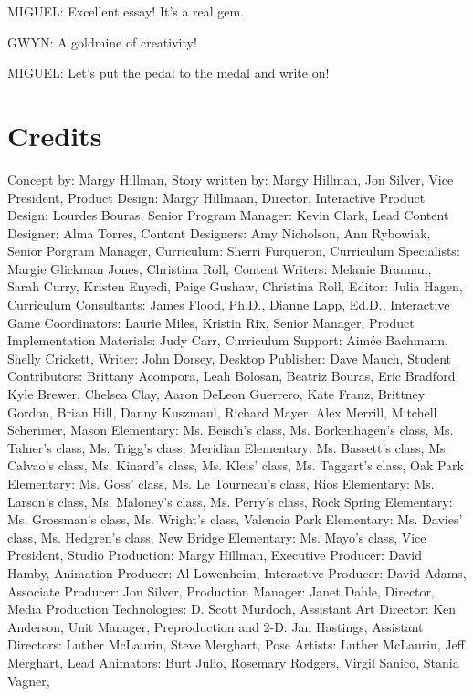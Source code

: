 MIGUEL:
Excellent essay!
It's a real gem.

GWYN:
A goldmine of creativity!

MIGUEL:
Let's put the pedal to the medal and write on!

\section{Credits}

Concept by: Margy Hillman,
Story written by: Margy Hillman, Jon Silver,
Vice President, Product Design: Margy Hillmaan,
Director, Interactive Product Design: Lourdes Bouras,
Senior Program Manager: Kevin Clark,
Lead Content Designer: Alma Torres,
Content Designers: Amy Nicholson, Ann Rybowiak,
Senior Porgram Manager, Curriculum: Sherri Furqueron,
Curriculum Specialists: Margie Glickman Jones, Christina Roll,
Content Writers: Melanie Brannan, Sarah Curry, Kristen Enyedi, Paige Gushaw, Christina Roll,
Editor: Julia Hagen,
Curriculum Consultants: James Flood, Ph.D., Dianne Lapp, Ed.D.,
Interactive Game Coordinators: Laurie Miles, Kristin Rix,
Senior Manager, Product Implementation Materials: Judy Carr,
Curriculum Support: Aimée Bachmann, Shelly Crickett,
Writer: John Dorsey,
Desktop Publisher: Dave Mauch,
Student Contributors: Brittany Acompora, Leah Bolosan, Beatriz Bouras, Eric Bradford, Kyle Brewer, Chelsea Clay, Aaron DeLeon Guerrero, Kate Franz, Brittney Gordon, Brian Hill, Danny Kuszmaul, Richard Mayer, Alex Merrill, Mitchell Scherimer,
Mason Elementary: Ms. Beisch's class, Ms. Borkenhagen's class, Ms. Talner's class, Ms. Trigg's class,
Meridian Elementary: Ms. Bassett's class, Ms. Calvao's class, Ms. Kinard's class, Ms. Kleis' class, Ms. Taggart's class,
Oak Park Elementary: Ms. Goss' class, Ms. Le Tourneau's class,
Rios Elementary: Ms. Larson's class, Ms. Maloney's class, Ms. Perry's class,
Rock Spring Elementary: Ms. Grossman's class, Ms. Wright's class,
Valencia Park Elementary: Ms. Davies' class, Ms. Hedgren's class,
New Bridge Elementary: Ms. Mayo's class,
Vice President, Studio Production: Margy Hillman,
Executive Producer: David Hamby,
Animation Producer: Al Lowenheim,
Interactive Producer: David Adams,
Associate Producer: Jon Silver,
Production Manager: Janet Dahle,
Director, Media Production Technologies: D. Scott Murdoch,
Assistant Art Director: Ken Anderson,
Unit Manager, Preproduction and 2-D: Jan Hastings,
Assistant Directors: Luther McLaurin, Steve Merghart,
Pose Artists: Luther McLaurin, Jeff Merghart,
Lead Animators: Burt Julio, Rosemary Rodgers, Virgil Sanico, Stania Vagner,
